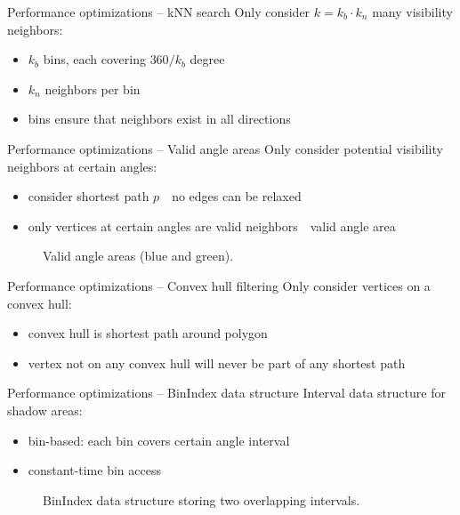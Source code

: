 \documentclass[xcolor={x11names}]{beamer}
\renewcommand{\n}{\hfill\\[0.5ex]}
\newenvironment{figcenter}
{%
	\parskip=0pt%
	\par%
	\nopagebreak%
	\centering%
}%
{%
	\par%
	\noindent%
	\ignorespacesafterend%
}
\begin{document}
	\begin{frame}{Performance optimizations -- kNN search}
		Only consider $k = k_b \cdot k_n$ many visibility neighbors:
		\begin{itemize}
			\item $k_b$ bins, each covering $360 / k_b$ degree
			\item $k_n$ neighbors per bin
			\item bins ensure that neighbors exist in all directions
		\end{itemize}
	\end{frame}
	
	\begin{frame}{Performance optimizations -- Valid angle areas}
		Only consider potential visibility neighbors at certain angles:\n
		\begin{itemize}
			\item consider shortest path $p$\ \textrightarrow\ no edges can be relaxed
			\item only vertices at certain angles are valid neighbors\ \textrightarrow\ valid angle area
		\end{itemize}
		\begin{figure}[b]
			\begin{figcenter}
				\scalebox{0.7}
				{
					
				}
			\end{figcenter}
			\caption{Valid angle areas (blue and green).}
		\end{figure}
	\end{frame}
	
	\begin{frame}{Performance optimizations -- Convex hull filtering}
		Only consider vertices on a convex hull:\n
		\begin{itemize}
			\item convex hull is shortest path around polygon
			\item[\textrightarrow\hspace{-0.1cm}] vertex not on any convex hull will never be part of any shortest path
		\end{itemize}
	\end{frame}
	
	\begin{frame}{Performance optimizations -- BinIndex data structure}
		Interval data structure for shadow areas:\n
		\begin{itemize}
			\item bin-based: each bin covers certain angle interval
			\item constant-time bin access
		\end{itemize}
		\begin{figure}[b]
			\begin{figcenter}
				\scalebox{0.7}
				{
					
				}
			\end{figcenter}
			\caption{BinIndex data structure storing two overlapping intervals.}
		\end{figure}
	\end{frame}
	
\end{document}
